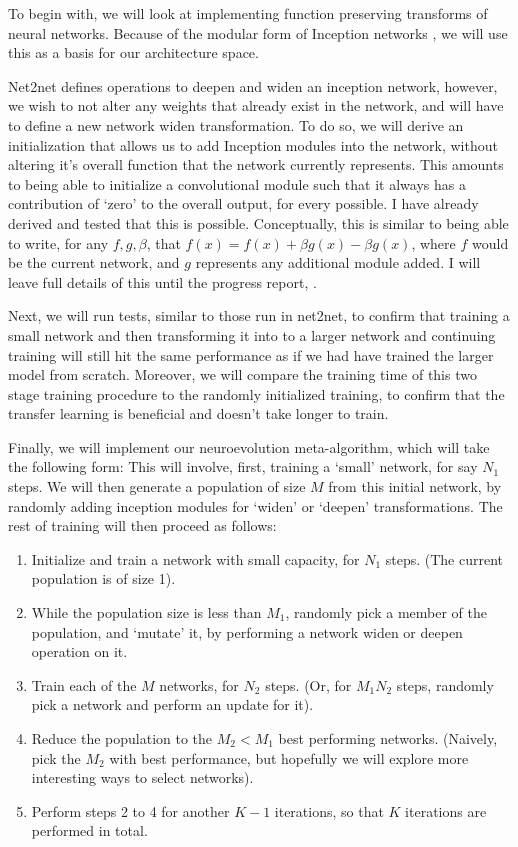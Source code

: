 \documentclass[10pt,twocolumn,letterpaper]{article}
\begin{document}
To begin with, we will look at implementing function preserving transforms of neural networks. Because of the modular form of Inception networks \cite{inception1,inception2,inception3}, we will use this as a basis for our architecture space. 

Net2net \cite{net2net} defines operations to deepen and widen an inception network, however, we wish to not alter any weights that already exist in the network, and will have to define a new network widen transformation. To do so, we will derive an initialization that allows us to add Inception modules into the network, without altering it's overall function that the network currently represents. This amounts to being able to initialize a convolutional module such that it always has a contribution of `zero' to the overall output, for every possible. I have already derived and tested that this is possible. Conceptually, this is similar to being able to write, for any $f,g,\beta$, that $f(x) = f(x)+\beta g(x) - \beta g(x)$, where $f$ would be the current network, and $g$ represents any additional module added. I will leave full details of this until the progress report, .

Next, we will run tests, similar to those run in net2net, to confirm that training a small network and then transforming it into to a larger network and continuing training will still hit the same performance as if we had have trained the larger model from scratch. Moreover, we will compare the training time of this two stage training procedure to the randomly initialized training, to confirm that the transfer learning is beneficial and doesn't take longer to train.

Finally, we will implement our neuroevolution meta-algorithm, which will take the following form: This will involve, first, training a `small' network, for say $N_1$ steps. We will then generate a population of size $M$ from this initial network, by randomly adding inception modules for `widen' or `deepen' transformations. The rest of training will then proceed as follows:
\begin{enumerate}
	\item Initialize and train a network with small capacity, for $N_1$ steps. (The current population is of size 1).
    \item While the population size is less than $M_1$, randomly pick a member of the population, and `mutate' it, by performing a network widen or deepen operation on it.
    \item Train each of the $M$ networks, for $N_2$ steps. (Or, for $M_1N_2$ steps, randomly pick a network and perform an update for it).
    \item Reduce the population to the $M_2 < M_1$ best performing networks. (Naively, pick the $M_2$ with best performance, but hopefully we will explore more interesting ways to select networks). 
    \item Perform steps 2 to 4 for another $K-1$ iterations, so that $K$ iterations are performed in total.
\end{enumerate}
\end{document}
